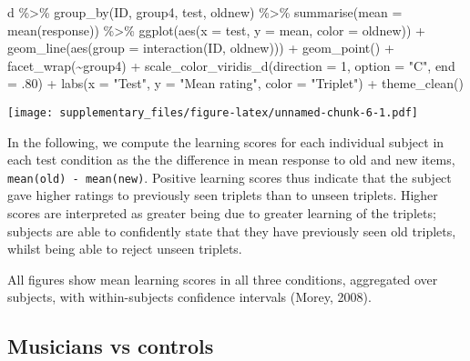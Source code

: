\documentclass[
  man,floatsintext]{apa7}
\newenvironment{Shaded}{\begin{snugshade}}{\end{snugshade}}
\newcommand{\AttributeTok}[1]{\textcolor[rgb]{0.77,0.63,0.00}{#1}}
\newcommand{\DecValTok}[1]{\textcolor[rgb]{0.00,0.00,0.81}{#1}}
\newcommand{\FunctionTok}[1]{\textcolor[rgb]{0.00,0.00,0.00}{#1}}
\newcommand{\NormalTok}[1]{#1}
\newcommand{\SpecialCharTok}[1]{\textcolor[rgb]{0.00,0.00,0.00}{#1}}
\newcommand{\StringTok}[1]{\textcolor[rgb]{0.31,0.60,0.02}{#1}}
\begin{document}
\begin{Shaded}
\begin{Highlighting}[]
\NormalTok{d }\SpecialCharTok{\%\textgreater{}\%}
  \FunctionTok{group\_by}\NormalTok{(ID, group4, test, oldnew) }\SpecialCharTok{\%\textgreater{}\%}
  \FunctionTok{summarise}\NormalTok{(}\AttributeTok{mean =} \FunctionTok{mean}\NormalTok{(response)) }\SpecialCharTok{\%\textgreater{}\%}
  \FunctionTok{ggplot}\NormalTok{(}\FunctionTok{aes}\NormalTok{(}\AttributeTok{x =}\NormalTok{ test, }\AttributeTok{y =}\NormalTok{ mean, }\AttributeTok{color =}\NormalTok{ oldnew)) }\SpecialCharTok{+}
  \FunctionTok{geom\_line}\NormalTok{(}\FunctionTok{aes}\NormalTok{(}\AttributeTok{group =} \FunctionTok{interaction}\NormalTok{(ID, oldnew))) }\SpecialCharTok{+}
  \FunctionTok{geom\_point}\NormalTok{() }\SpecialCharTok{+}
  \FunctionTok{facet\_wrap}\NormalTok{(}\SpecialCharTok{\textasciitilde{}}\NormalTok{group4) }\SpecialCharTok{+}
  \FunctionTok{scale\_color\_viridis\_d}\NormalTok{(}\AttributeTok{direction =} \DecValTok{1}\NormalTok{, }\AttributeTok{option =} \StringTok{"C"}\NormalTok{, }\AttributeTok{end =}\NormalTok{ .}\DecValTok{80}\NormalTok{) }\SpecialCharTok{+}
  \FunctionTok{labs}\NormalTok{(}\AttributeTok{x =} \StringTok{"Test"}\NormalTok{, }\AttributeTok{y =} \StringTok{"Mean rating"}\NormalTok{, }\AttributeTok{color =} \StringTok{"Triplet"}\NormalTok{) }\SpecialCharTok{+}
  \FunctionTok{theme\_clean}\NormalTok{()}
\end{Highlighting}
\end{Shaded}

\texttt{[image: supplementary\_files/figure-latex/unnamed-chunk-6-1.pdf]}

In the following, we compute the learning scores for each individual subject in each test condition as the the difference in mean response to old and new items, \texttt{mean(old)\ -\ mean(new)}. Positive learning scores thus indicate that the subject gave higher ratings to previously seen triplets than to unseen triplets. Higher scores are interpreted as greater being due to greater learning of the triplets; subjects are able to confidently state that they have previously seen old triplets, whilst being able to reject unseen triplets.

All figures show mean learning scores in all three conditions, aggregated over subjects, with within-subjects confidence intervals (Morey, 2008).

\hypertarget{musicians-vs-controls}{%
\subsection{Musicians vs controls}\label{musicians-vs-controls}}
\end{document}
